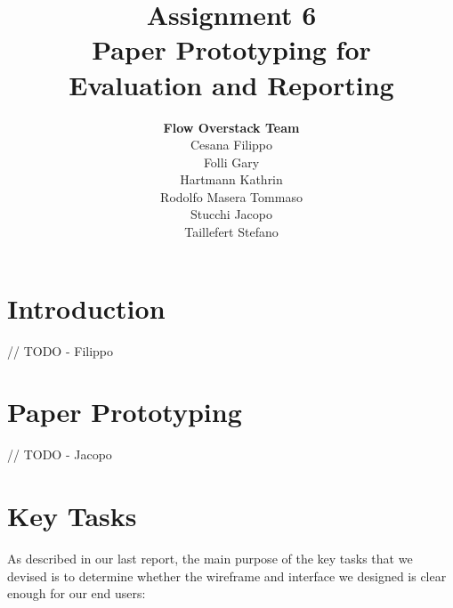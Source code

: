 \documentclass[12pt]{scrartcl}
\title{Assignment 6\\ Paper Prototyping for\\ Evaluation and Reporting}
\author{\textbf{Flow Overstack Team}\\ Cesana Filippo\\ Folli Gary\\ Hartmann Kathrin\\ Rodolfo Masera Tommaso\\ Stucchi Jacopo\\ Taillefert Stefano}
\date{}
\begin{document}
\maketitle

\tableofcontents

\newpage

\section{Introduction}

	
	// TODO - Filippo
	
	
\section{Paper Prototyping}

	
	// TODO - Jacopo
	
	
\section{Key Tasks}

	
	As described in our last report, the main purpose of the key tasks that we devised is to determine 
	whether the wireframe and interface we designed is clear enough for our end users:
	
\end{document}
